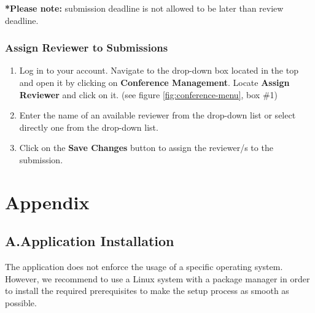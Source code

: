 \documentclass[nochapterpage,nopartpage,noheadingspace,numbersubsubsec,bigchapter,colorback,accentcolor=tud9c,10pt]{tudreport}
\begin{document}

\textbf{*Please note:} submission deadline is not allowed to be later than review deadline.

	\section{Assign Reviewer to Submissions}

\begin{enumerate}
	\item	Log in to your account. Navigate to the drop-down box located in the top and open it by clicking on \textbf{Conference Management}. Locate \textbf{Assign Reviewer} and click on it. (see figure \ref{fig:conference-menu}, box \#1)
	\item	Enter the name of an available reviewer from the drop-down list or select directly one from the drop-down list.
	\item	Click on the \textbf{Save Changes} button to assign the reviewer/s to the submission.
\end{enumerate}


\part{Appendix}
\label{part:appendix}

  \chapter*{A.\quad Application Installation}
  \label{ch:appendix:setup}

    The application does not enforce the usage of a specific operating system. However, we recommend to use a Linux system with a package manager in order to install the required prerequisites to make the setup process as smooth as possible.
\end{document}
